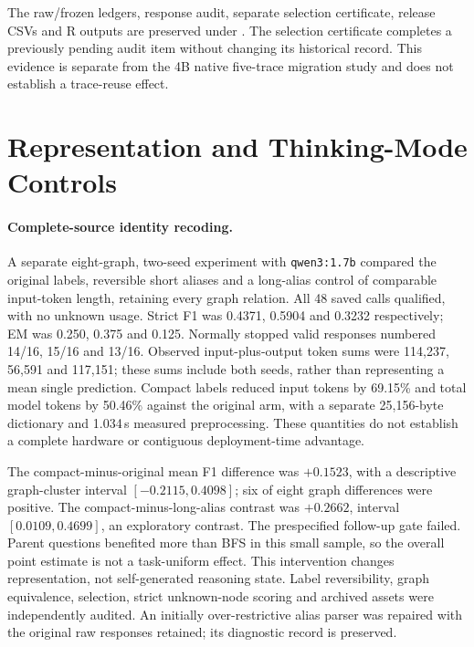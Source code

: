 \documentclass[10pt]{article}
\begin{document}
The raw/frozen ledgers, response audit, separate selection certificate, release CSVs and R outputs are preserved under \protect{}. The selection certificate completes a previously pending audit item without changing its historical record. This evidence is separate from the 4B native five-trace migration study and does not establish a trace-reuse effect.

\section{Representation and Thinking-Mode Controls}
\label{app:representation-controls}

\paragraph{Complete-source identity recoding.} A separate eight-graph, two-seed experiment with \texttt{qwen3:1.7b} compared the original labels, reversible short aliases and a long-alias control of comparable input-token length, retaining every graph relation. All 48 saved calls qualified, with no unknown usage. Strict F1 was 0.4371, 0.5904 and 0.3232 respectively; EM was 0.250, 0.375 and 0.125. Normally stopped valid responses numbered 14/16, 15/16 and 13/16. Observed input-plus-output token sums were 114,237, 56,591 and 117,151; these sums include both seeds, rather than representing a mean single prediction. Compact labels reduced input tokens by 69.15\% and total model tokens by 50.46\% against the original arm, with a separate 25,156-byte dictionary and 1.034\,s measured preprocessing. These quantities do not establish a complete hardware or contiguous deployment-time advantage.

The compact-minus-original mean F1 difference was $+0.1523$, with a descriptive graph-cluster interval $[-0.2115,0.4098]$; six of eight graph differences were positive. The compact-minus-long-alias contrast was $+0.2662$, interval $[0.0109,0.4699]$, an exploratory contrast. The prespecified follow-up gate failed. Parent questions benefited more than BFS in this small sample, so the overall point estimate is not a task-uniform effect. This intervention changes representation, not self-generated reasoning state. Label reversibility, graph equivalence, selection, strict unknown-node scoring and archived assets were independently audited. An initially over-restrictive alias parser was repaired with the original raw responses retained; its diagnostic record is preserved.
\end{document}
